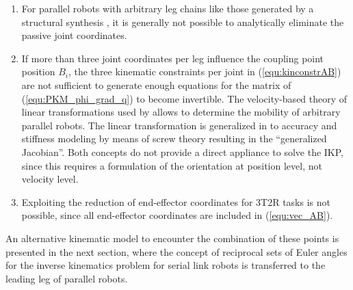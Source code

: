 \documentclass[robotics,article,submit,moreauthors,pdftex]{Definitions/mdpi}
\newcommand{\bm}[1]{\boldsymbol{#1}}
\let\Phi\varPhi
\begin{document}
\begin{enumerate}
    \item For parallel robots with arbitrary leg chains like those generated by a structural synthesis \cite{KongGos2005, Gogu2008, RamirezKotOrt2015}, it is generally not possible to analytically eliminate the passive joint coordinates.
    \item If more than three joint coordinates per leg influence the coupling point position $B_i$, the three kinematic constraints per joint in (\ref{equ:kinconstrAB}) are not sufficient to generate enough equations for the matrix of (\ref{equ:PKM_phi_grad_q}) to become invertible.
    The velocity-based theory of linear transformations used by \cite{Gogu2008} allows to determine the mobility of arbitrary parallel robots.
    The linear transformation is generalized in \cite{HuangLiuChe2011} to  accuracy and stiffness modeling by means of screw theory resulting in the ``generalized Jacobian''.
    Both concepts do not provide a direct appliance to solve the IKP, since this requires a formulation of the orientation at position level, not velocity level.
    \item Exploiting the reduction of end-effector coordinates for 3T2R tasks is not possible, since all end-effector coordinates are included in (\ref{equ:vec_AB}).
\end{enumerate}
%
An alternative kinematic model to encounter the combination of these points is presented in the next section, where the concept of reciprocal sets of Euler angles for the inverse kinematics problem for serial link robots \cite{1_SchapplerTapOrt2019} is transferred to the leading leg of parallel robots.

%

\end{document}
